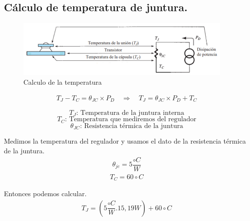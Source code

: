 \subsection{Cálculo de temperatura de juntura.}

\begin{figure}[H]
  \centering
  \includegraphics[width=0.95\textwidth]{images/calculoTemperatura.png}
  \caption{Calculo de la temperatura}
\end{figure}

\begin{equation}
  \begin{aligned}
    T_J - T_C = \theta_{JC} \times P_D \quad \Rightarrow \quad T_J = \theta_{JC} \times P_D + T_C
   \end{aligned}
\end{equation}

\[
  T_J \text{: Temperatura de la juntura interna}
\]
\[
  T_C \text{: Temperatura que mediremos del regulador}
\]
\[
  \theta_{JC} \text{: Resistencia térmica de la juntura}
\]

Medimos la temperatura del regulador y usamos el dato de la resistencia térmica de la juntura. \\

\begin{equation}
  \begin{aligned}
    \theta_{jc} = 5\dfrac{\circ C}{W}
  \end{aligned}
\end{equation}
\begin{equation}
  \begin{aligned}
    T_C = 60 \circ C
  \end{aligned}
\end{equation}

Entonces podemos calcular. \\

\begin{equation}
  \begin{aligned}
    T_J = (5\dfrac{\circ C}{W} . 15,19 W) + 60 \circ C
  \end{aligned}
\end{equation}

